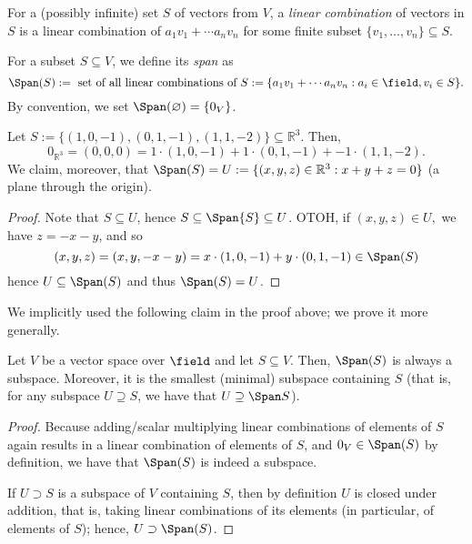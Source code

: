 \begin{definition}
    For a (possibly infinite) set $S$ of vectors from $V$, a \emph{linear combination} of vectors in $S$ is a linear combination of $a_1 v_1 + \cdots a_n v_n$ for some finite subset $\{v_1, \dots, v_n\} \subseteq S$.\footnotemark
\end{definition}

\begin{definition}[Span]
    For a subset $S \subseteq V$, we define its \emph{span} as \[
    \Span(S):= \text{ set of all linear combinations of } S := \{a_1 v_1 + \cdots a_n v_n : a_i \in \field, v_i \in S\}.    
    \]
    By convention, we set $\Span(\varnothing) = \{0_V\}$.
\end{definition}
\begin{example}
    Let $S := \{(1, 0, -1), (0, 1, -1), (1, 1, -2)\} \subseteq \mathbb{R}^3$. Then, \[
    0_{\mathbb{R}^3} =(0,0,0) = 1 \cdot (1, 0, -1) + 1 \cdot (0, 1, -1) + -1 \cdot (1, 1, -2).
    \]
    We claim, moreover, that $\Span (S) = U := \{(x, y, z) \in \mathbb{R}^3 : x+y+z = 0\}$ (a plane through the origin).
    \begin{proof}
        Note that $S \subseteq U$, hence $S \subseteq \Span{S} \subseteq U$. OTOH, if $(x, y, z) \in U, $ we have $z = - x - y$, and so \[
        (x, y, z) = (x, y, -x - y) = x\cdot (1, 0, -1) + y \cdot (0, 1, -1) \in \Span (S)    
        \]
        hence $U \subseteq \Span (S)$ and thus $\Span (S) = U$.
    \end{proof}
\end{example}

\begin{remark}
    We implicitly used the following claim in the proof above; we prove it more generally.
\end{remark}
\begin{proposition}
    Let $V$ be a vector space over $\field$ and let $S \subseteq V$. Then, $\Span (S)$ is always a subspace. Moreover, it is the smallest (minimal) subspace containing $S$ (that is, for any subspace $U \supseteq S$, we have that $U \supseteq \Span S$).
\end{proposition}

\begin{proof}
    Because adding/scalar multiplying linear combinations of elements of $S$ again results in a linear combination of elements of $S$, and $0_V \in \Span (S)$ by definition, we have that $\Span (S)$ is indeed a subspace.

    If $U \supset S$ is a subspace of $V$ containing $S$, then by definition $U$ is closed under addition, that is, taking linear combinations of its elements (in particular, of elements of $S$); hence, $U \supset \Span (S)$.
\end{proof}

